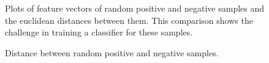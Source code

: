 \begin{figure}[htp]
\begin{center}
  \end{center}
  \caption[Comparative plots of random samples.]
  {Plots of feature vectors of random positive and negative samples and the euclidean distances between them. This comparison shows the challenge in training a classifier for these samples.}
  \label{ComparativeFVPlot.figure:edge}
\end{figure}




\begin{figure}[t]
  \caption[Distance of Positive and Negative samples]
  {Distance between random positive and negative samples.}
  \label{DistanceOFPosandNegHist.figure}
\end{figure}

